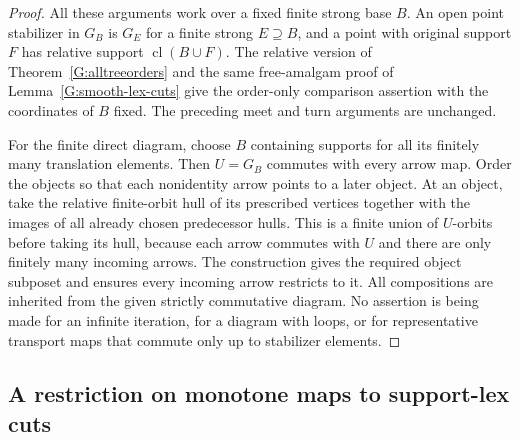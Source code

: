\begin{proof}
All these arguments work over a fixed finite strong base $B$.
An open point stabilizer in $G_B$ is $G_E$ for a finite strong
$E\supseteq B$, and a point with original support $F$ has
relative support $\operatorname{cl}(B\cup F)$. The relative
version of Theorem~\ref{G:alltreeorders} and the same
free-amalgam proof of Lemma~\ref{G:smooth-lex-cuts} give the
order-only comparison assertion with the coordinates of $B$
fixed. The preceding meet and turn arguments are unchanged.

For the finite direct diagram, choose $B$ containing supports
for all its finitely many translation elements. Then $U=G_B$
commutes with every arrow map. Order the objects so that each
nonidentity arrow points to a later object. At an object, take
the relative finite-orbit hull of its prescribed vertices
together with the images of all already chosen predecessor
hulls. This is a finite union of $U$-orbits before taking its
hull, because each arrow commutes with $U$ and there are only
finitely many incoming arrows. The construction gives the
required object subposet and ensures every incoming arrow
restricts to it. All compositions are inherited from the
given strictly commutative diagram. No assertion is being
made for an infinite iteration, for a diagram with loops, or
for representative transport maps that commute only up to
stabilizer elements.
\end{proof}


\subsection{A restriction on monotone maps to support-lex cuts}

